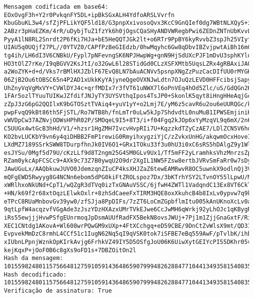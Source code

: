 \documentclass[11pt]{article}
\begin{document}
    \begin{Verbatim}[commandchars=\\\{\}]
Mensagem codificada em base64: EOxOvgF3h+Y2r0PvkqnFY5DL+ipBkSGxALH4YdfoARSLVvrfn
KbuGbuKL3w4/sfZjPFLikYQF5ld18/G3pnpXxivosoQvx3KcC9GnQIef0dg7WBtNLXQyS+ikW7qBZ7Zg
2ABzr3pHaEZKm/4rR/uDybjTuZ1fzYk6h0jOgsCQaSHyANDVWRegbPwi6ZEDnZNTnUbKvvLa9mkLM12F
PyyA1lN8RL2Snrdt2P6fKi7HJa+bE5HeQQTJGk2lt+o6RTr9PpBY6kyRvvbZ3spJh25VIyf/lTsSK7pZ
UIAU5q0UQjf27PL//0YTVZ0/CAPfPzBeGIEdzb/0hwMqyhc6Gw8qDbvIBZvjpwtAiBh16mCO3goWA9Qa
tg4ih/LH6dI3V6CNBkU/Fypl7pNFevngSK6NPJHwpWg+gnN9HjSdUXcPJF1mDvU3sphKYloFGvJa4uAx
HO3tOlZ7rKe/I9qBGVV2KsJtI/o32GwL6l28STidGd0CLzXSFXMtb5UqsLZRx4gRBAxiJA0L+rfdNgho
a2WoZYK+d+d/Vks7rBMlHXJZblF67EvQ8LN7bAuACNVv5psnpXNgZzPuzCacDIfUU0rMYGHCL/+wW1ae
06ZjB2Ou6tOBSC65n4P2AD1xUkkKyYAjyneQgeOVXNJwLdtn7OJuQzLEVD0HFFcibsjSapybfkFa5JYE
UhZnyVqVgMxVY+CVWlDYJ4c+qrfMDIx7r3fVT61uNWX7l6oPnVEq4hOd5Zlc/uS/GdQGn2H7u9TsUY7T
1FAr5ozlTYuuTUIKwJZfdifJNJyTY3UYSVthqIpos4TsJP0+SkonlK5qyt8iHngHHeAqjGcIXvQ5VEIo
zZpJ3zG6pG2QQIlxK9bGTOSztTVAiq4+yuV1yY+o2Lmj7E/yM6z5cavR6u2ou6eUURQGc/kzxOFVgqE6
pwpFvqQ9kBt86th5FjSTL/Ro7WTB8h/fnLmTr0uLw5kJp7ShdvdtL0nuMuB1IPWSEmjiniKQbg2D3kOL
vWVDpCw37AZNvjODWsHPhR02P/SMOqeL9I5+8T3/i+f04Fgq2kJOp6xYyMzqVL9q6mX/2n6QJYjYi+LG
C5UUGx4wtGcB3hHd/V1/+hzsr1HgZMH7IvcvHvpRIi7U+KqzzkdTZyCzAE7/LDlZCN5V6hoaLVb4uOPJ
KO2bvLUCKbY9vn6y4qiDHBB2FmP1rewiG0RmyihxygziYjC/zZvkxUnHG/akqwmOcxHoveIYFH+5Xz5O
LXdMZ7189SSrkSWW8TDurpfhnJk0IV6O1+GRx1TOku33f3u0hU3i0xC6sRS5hDAlgZ9y1WlCzJMWip32
esJYSu/0Mgf5d79U/cKzLLf9d8T2ngm25G4SM0GLv9Ux1/Tf5mFF2yLramhksVhzMnrzsZpSkyRuLKsI
RZam0ykcApFCSCc9+AXk9c73Z7B0ywqU2O9dr2XgIL1NW5FZsw8ertbJVRvSmFaRr0w7sDybxO6cJrkY
JAwUGuLx/AAQbkuwJUVO0JdemzqnZIuCP4ksXHJZaZ6tewEAMRwvR8OC5uwnkX9odlnQj3VlAOE1ENzq
mQFgEWD5Rwyyg8G4NCNn6ebom5dPG0kiFtZROLspoz7Dx/3bKTrhYSY2LTvnOY55lLpwU/MO3HYVV/ul
xWRlhxoNkUNd+CpT1/wQZgR3dTVq0izTxGNAuVSSC/6jfwH4ZWTl1VadqndC13Ex8VT6CkTeDnkvngsV
+HN/k69f2r68xtOqzLElwkOxlr+8zhSdCaeeFxTIRM3HQE8oxXkuhcB4b8IxLv0ypvw7q9k7H60XwJRO
eTPcC8RUaMnbovGv39yw0/zfSJja8PpDIFs/7zZT6LoCmZGpbflmItu005kAnUKnoXcLv0aOnk4qTBpC
9qtLpfW4acqzvfVGgAde3zJszYDzHXAzxUMrTVkEJwe6CcJwMH6qWrkj92yLhOJc1qKBygRkB3vpgCZN
iRs55ewjjjHvwPSfgEUnrmoqJpDsmAUUfRadFX5BekN8ovsJWUj+7Pj1m1ZjjGnaGxtF/RimDde2mpJl
XEC1CNtdg1AKovA+Wl608wrPQwGM9xUXp+4FtXCchgq+eD59CBE/9DnCtZvWlsX9mt/QD31QqgXTUHA3
EvpvekMmDzC8rmhL4CCf51c1IugN62Nq5qI9qVSK0tok7iSFBE7eBq559AwF/pTvlbK/ihbhjqwzSN2J
xIUbnLPpnjWznkOpKIrkAvjg6FrhkVZ49IY5D5OSfgJoU06K6UiwXytGEIYcPI55DKhr05vzIfHgUtz4
kejKqxP+jOoF0B6c8gXs9oFD1s+7DBZOitOn2l
Hash da mensagem:
101559824801157566481275910591436486590799948262884771044134935815408357614456
Hash decodificado:
101559824801157566481275910591436486590799948262884771044134935815408357614456
Verificação de assinatura: True
    \end{Verbatim}
\end{document}
